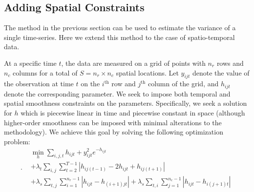 \documentclass[letterpaper]{article} %
\newcommand{\attn}[1]{\textcolor{red}{TODO: #1}}
\begin{document}

\subsection{Adding Spatial Constraints}
\label{sec:exten}

The method in the previous section can be used to estimate the
variance of a single time-series. Here we extend this
method to the case of spatio-temporal data. 

At a specific time $t$, the data are measured on a grid of points with
$n_r$ rows and $n_c$ columns for a total of $S=n_r\times n_c$ spatial
locations. Let $y_{ijt}$ denote the value of the 
observation at time $t$ on the $i^\text{th}$ row and $j^\text{th}$
column of the grid, and $h_{ijt}$ denote the corresponding
parameter. We seek to impose both temporal and spatial smoothness 
constraints on the parameters. Specifically, we seek a solution
for $h$ which is piecewise linear in time and piecewise constant in
space (although higher-order smoothness can be imposed with minimal
alterations to the methodology). We achieve this goal
by solving the following optimization problem: 
{\small
\begin{equation}
\label{eq:l1tf_var_st}.
\begin{aligned}
&\min_h \sum_{i,j,t}h_{ijt}+y_{ijt}^2e^{-h_{ijt}}\\& +\lambda_t
\sum_{i,j} \sum_{t=2}^{T-1}
\left|h_{ij(t-1)}-2h_{ijt}+h_{ij(t+1)}\right|\\ 
&+\lambda_s \sum_{t,j} \sum_{i=1}^{n_r-1} \left|h_{ijt}-h_{(i+1)jt}\right|
+\lambda_s \sum_{t,i} \sum_{j=1}^{n_c-1} \left|h_{ijt}-h_{i(j+1)t}\right|
\end{aligned}
\end{equation}
}%
\end{document}
